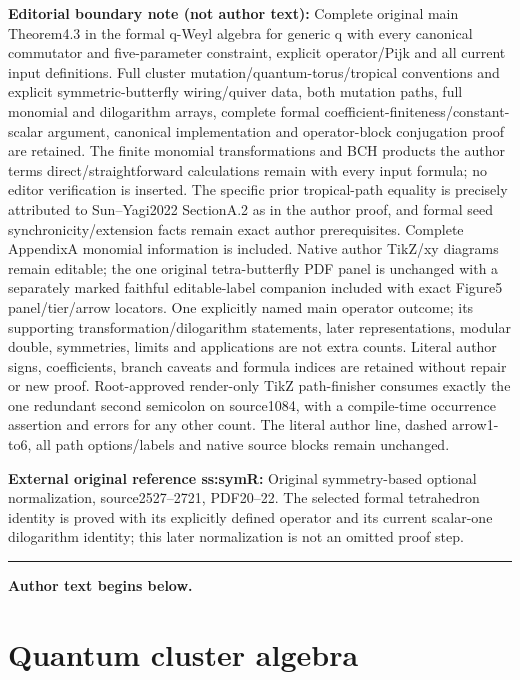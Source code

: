 \documentclass[11pt]{article}
\numberwithin{equation}{section}
\numberwithin{equation}{section}
\begin{document}
\medskip\noindent\textbf{Editorial boundary note (not author text):} Complete original main Theorem4.3 in the formal q-Weyl algebra for generic q with every canonical commutator and five-parameter constraint, explicit operator/Pijk and all current input definitions. Full cluster mutation/quantum-torus/tropical conventions and explicit symmetric-butterfly wiring/quiver data, both mutation paths, full monomial and dilogarithm arrays, complete formal coefficient-finiteness/constant-scalar argument, canonical implementation and operator-block conjugation proof are retained. The finite monomial transformations and BCH products the author terms direct/straightforward calculations remain with every input formula; no editor verification is inserted. The specific prior tropical-path equality is precisely attributed to Sun–Yagi2022 SectionA.2 as in the author proof, and formal seed synchronicity/extension facts remain exact author prerequisites. Complete AppendixA monomial information is included. Native author TikZ/xy diagrams remain editable; the one original tetra-butterfly PDF panel is unchanged with a separately marked faithful editable-label companion included with exact Figure5 panel/tier/arrow locators. One explicitly named main operator outcome; its supporting transformation/dilogarithm statements, later representations, modular double, symmetries, limits and applications are not extra counts. Literal author signs, coefficients, branch caveats and formula indices are retained without repair or new proof. Root-approved render-only TikZ path-finisher consumes exactly the one redundant second semicolon on source1084, with a compile-time occurrence assertion and errors for any other count. The literal author line, dashed arrow1-to6, all path options/labels and native source blocks remain unchanged.\par
\noindent\textbf{External original reference ss:symR:} Original symmetry-based optional normalization, source2527–2721, PDF20–22. The selected formal tetrahedron identity is proved with its explicitly defined operator and its current scalar-one dilogarithm identity; this later normalization is not an omitted proof step.\par
\medskip\hrule\medskip\noindent\textbf{Author text begins below.}\par
\setcounter{section}{1}
\section{Quantum cluster algebra}\label{s:qca}
\end{document}
